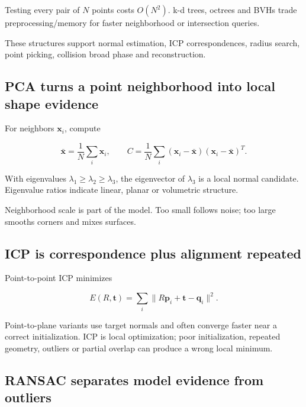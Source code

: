 \hypertarget{04-visual-computing-ii-ch035-spatial-data-structures-make-local-geometry-affordable}{}

Testing every pair of \(N\) points costs \(O(N^2)\). k-d trees, octrees and BVHs trade preprocessing/memory for faster neighborhood or intersection queries.

These structures support normal estimation, ICP correspondences, radius search, point picking, collision broad phase and reconstruction.

\subsection{PCA turns a point neighborhood into local shape evidence}\label{04-visual-computing-ii-ch035-pca-turns-a-point-neighborhood-into-local-shape-evidence}

\hypertarget{04-visual-computing-ii-ch035-pca-turns-a-point-neighborhood-into-local-shape-evidence}{}

For neighbors \(\mathbf x_i\), compute

\[
\bar{\mathbf x}=\frac1N\sum_i\mathbf x_i,
\qquad
C=\frac1N\sum_i(\mathbf x_i-\bar{\mathbf x})(\mathbf x_i-\bar{\mathbf x})^T.
\]

With eigenvalues \(\lambda_1\ge\lambda_2\ge\lambda_3\), the eigenvector of \(\lambda_3\) is a local normal candidate. Eigenvalue ratios indicate linear, planar or volumetric structure.

Neighborhood scale is part of the model. Too small follows noise; too large smooths corners and mixes surfaces.

\subsection{ICP is correspondence plus alignment repeated}\label{04-visual-computing-ii-ch035-icp-is-correspondence-plus-alignment-repeated}

\hypertarget{04-visual-computing-ii-ch035-icp-is-correspondence-plus-alignment-repeated}{}

Point-to-point ICP minimizes

\[
E(R,\mathbf t)=\sum_i\|R\mathbf p_i+\mathbf t-\mathbf q_i\|^2.
\]

Point-to-plane variants use target normals and often converge faster near a correct initialization. ICP is local optimization; poor initialization, repeated geometry, outliers or partial overlap can produce a wrong local minimum.

\subsection{RANSAC separates model evidence from outliers}\label{04-visual-computing-ii-ch035-ransac-separates-model-evidence-from-outliers}

